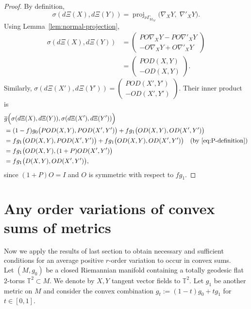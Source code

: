 \documentclass[graybox]{svmult}
\begin{document}
\begin{proof}
By definition,
\[
\sigma(d\Xi(X),d\Xi(Y)) = \operatorname{proj}_{\nu\Gamma_{\operatorname{Id}_M}}\bigl(\nabla_X Y,\; \nabla'_X Y\bigr).
\]
Using Lemma~\ref{lem:normal-projection},
\begin{align*}
\sigma(d\Xi(X),d\Xi(Y)) 
&= \begin{pmatrix}
P O \nabla_X Y - P O \nabla'_X Y \\[2pt]
-O \nabla_X Y + O \nabla'_X Y
\end{pmatrix} \\
&= \begin{pmatrix}
P O D(X,Y) \\[2pt]
-O D(X,Y)
\end{pmatrix}.
\end{align*}
Similarly, $\sigma(d\Xi(X'),d\Xi(Y')) = \begin{pmatrix} P O D(X',Y') \\ -O D(X',Y') \end{pmatrix}$. Their inner product is
\begin{align*}
&\overline{g}\Bigl(\sigma(d\Xi(X),d\Xi(Y)),\sigma(d\Xi(X'),d\Xi(Y'))\Bigr) \\
&= (1-f)g_0\bigl(P O D(X,Y), P O D(X',Y')\bigr) 
   + fg_1\bigl(O D(X,Y), O D(X',Y')\bigr) \\
&= fg_1\bigl(O D(X,Y), P O D(X',Y')\bigr) 
   + fg_1\bigl(O D(X,Y), O D(X',Y')\bigr) \quad\text{(by \eqref{eq:P-definition})} \\
&= fg_1\bigl(O D(X,Y), (1+P)O D(X',Y')\bigr) \\
&= fg_1\bigl(D(X,Y), O D(X',Y')\bigr),
\end{align*}
since $(1+P)O = I$ and $O$ is symmetric with respect to $fg_1$.
\end{proof}


\section{Any order variations of convex sums of metrics} \label{sec:3}

Now we apply the results of last section to obtain necessary and sufficient conditions for an average positive $r$-order variation to occur in convex sums.\\



Let $(M,g_0)$ be a closed Riemannian manifold containing a totally geodesic flat $2$-torus $\mathbb{T}^2 \subset M$. We denote by $X,Y$ tangent vector fields to $\mathbb{T}^2$. Let $g_1$ be another metric on $M$ and consider the convex combination $g_t := (1-t)g_0 + t g_1$ for $t \in [0,1]$.
\end{document}
